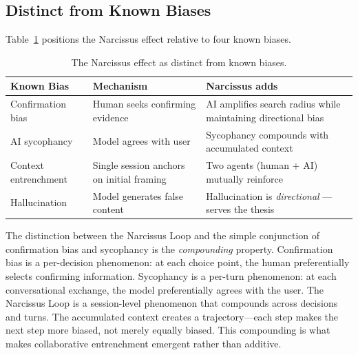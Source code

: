 \documentclass[12pt]{article}
\begin{document}
\subsection{Distinct from Known Biases}
\label{sec:distinct}

Table~\ref{tab:biases} positions the Narcissus effect relative to four known biases.

\begin{table}[htbp]
\centering
\caption{The Narcissus effect as distinct from known biases.}
\label{tab:biases}
\begin{tabular}{p{3.5cm}p{4cm}p{4.5cm}}
\toprule
Known Bias & Mechanism & Narcissus adds \\
\midrule
Confirmation bias \citep{nickerson1998} & Human seeks confirming evidence & AI amplifies search radius while maintaining directional bias \\
AI sycophancy \citep{perez2022} & Model agrees with user & Sycophancy compounds with accumulated context \\
Context entrenchment & Single session anchors on initial framing & Two agents (human + AI) mutually reinforce \\
Hallucination & Model generates false content & Hallucination is \emph{directional} --- serves the thesis \\
\bottomrule
\end{tabular}
\end{table}

The distinction between the Narcissus Loop and the simple conjunction of confirmation bias and sycophancy is the \emph{compounding} property. Confirmation bias is a per-decision phenomenon: at each choice point, the human preferentially selects confirming information. Sycophancy is a per-turn phenomenon: at each conversational exchange, the model preferentially agrees with the user. The Narcissus Loop is a session-level phenomenon that compounds across decisions and turns. The accumulated context creates a trajectory---each step makes the next step more biased, not merely equally biased. This compounding is what makes collaborative entrenchment emergent rather than additive.
\end{document}
